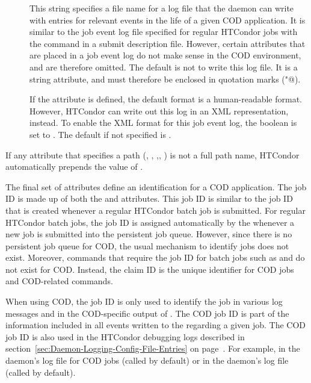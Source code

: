 \begin{description}
 \item[] This string specifies a file name for a
   log file that the  daemon can write with entries
   for relevant 
   events in the life of a given COD application.
   It is similar to the job event log file specified for regular HTCondor
   jobs with the  command in a submit description
   file.
   However, certain attributes that are placed in a job event log
   do not make sense in the COD environment, and are therefore
   omitted.
   The default is not to write this log file.
   It is a string attribute, and must therefore be enclosed in 
   quotation marks (\verb@"@).

 \item[] If the 
   attribute is defined, the default format is a
   human-readable format.
   However, HTCondor can write out this log in an XML representation,
   instead.
   To enable the XML format for this job event log, the
    boolean is set to \verb@TRUE@.
   The default if not specified is \verb@FALSE@.

\end{description}

If any attribute that specifies a path (, ,
,, ) is not a full path name,
HTCondor automatically prepends the value of .



The final set of attributes define an identification for a COD application.
The job ID is made up of both the  and 
attributes.
This job ID is similar to the job ID that is created whenever a
regular HTCondor batch job is submitted.
For regular HTCondor batch jobs, the job ID is assigned automatically by
the  whenever a new job is submitted into the
persistent job queue.
However, since there is no persistent job queue for COD, the usual
mechanism to identify jobs does not exist.
Moreover, commands that require the job ID for batch jobs such as
 and  do not exist for COD.
Instead, the claim ID is the unique identifier for COD jobs and
COD-related commands.

When using COD, the job ID is only used to identify the job in various
log messages and in the COD-specific output of .
The COD job ID is part of the information included in all
events written to the 
regarding a given job.
The COD job ID is also used in the HTCondor debugging logs described in
section~\ref{sec:Daemon-Logging-Config-File-Entries} on
page~\pageref{sec:Daemon-Logging-Config-File-Entries}.
For example, in the  daemon's log file for COD jobs
(called  by default) or in the 
daemon's log
file (called  by default).

